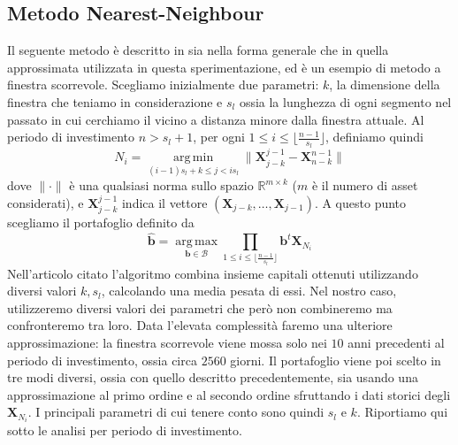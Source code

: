 \documentclass[a4paper,11pt]{book}
\theoremstyle{plain}
\theoremstyle{definition}
\theoremstyle{remark}
\newcommand{\R}{\mathbb{R}}
\newcommand{\X}{\bm{X}}
\newcommand{\B}{\bm{b}}
\DeclareMathOperator*{\argmax}{arg\,max}
\DeclareMathOperator*{\argmin}{arg\,min}
\begin{document}
\subsection{Metodo Nearest-Neighbour}
Il seguente metodo è descritto in \cite{NN} sia nella forma generale che in quella approssimata utilizzata in questa sperimentazione, ed è un esempio di metodo a finestra scorrevole.\newline
Scegliamo inizialmente due parametri: $k$, la dimensione della finestra che teniamo in considerazione e $s_l$ ossia la lunghezza di ogni segmento nel passato in cui cerchiamo il vicino a distanza minore dalla finestra attuale.\newline
Al periodo di investimento $n>s_l+1$, per ogni $1\leq i\leq \lfloor \frac{n-1}{s_l}\rfloor$, definiamo quindi 
\begin{equation*}
	N_i = \argmin\limits_{(i-1)s_l+k\leq j < is_l}{\| \X_{j-k}^{j-1}-\X_{n-k}^{n-1}\|}
\end{equation*}
dove $\|\cdot \|$ è una qualsiasi norma sullo spazio $\R^{m\times k}$ ($m$ è il numero di asset considerati), e $\X_{j-k}^{j-1}$ indica il vettore $(\X_{j-k},\ldots, \X_{j-1})$. 
A questo punto scegliamo il portafoglio definito da
\begin{equation*}
	\hat{\B} = \argmax\limits_{\B\in \mathcal{B}}\prod_{1\leq i\leq \lfloor \frac{n-1}{s_l}\rfloor}{\B^t\X_{N_i}}
\end{equation*}
Nell'articolo citato l'algoritmo combina insieme capitali ottenuti utilizzando diversi valori $k, s_l$, calcolando una media pesata di essi. Nel nostro caso, utilizzeremo diversi valori dei parametri che però non combineremo ma confronteremo tra loro.\newline
Data l'elevata complessità faremo una ulteriore approssimazione: la finestra scorrevole viene mossa solo nei $10$ anni precedenti al periodo di investimento, ossia circa $2560$ giorni.\newline
Il portafoglio viene poi scelto in tre modi diversi, ossia con quello descritto precedentemente, sia usando una approssimazione al primo ordine e al secondo ordine sfruttando i dati storici degli $\X_{N_i}$.\newline
I principali parametri di cui tenere conto sono quindi $s_l$ e $k$. Riportiamo qui sotto le analisi per periodo di investimento.
\end{document}
